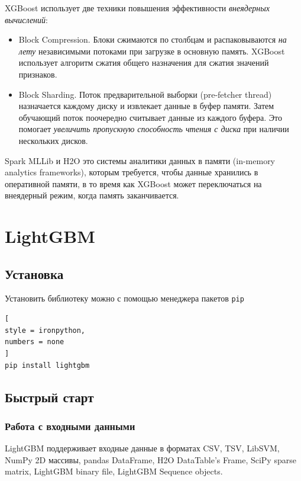 \documentclass[%
	11pt,
	a4paper,
	utf8,
		]{article}
\begin{document}
XGBoost использует две техники повышения эффективности \emph{внеядерных вычислений}:
\begin{itemize}
	\item Block Compression. Блоки сжимаются по столбцам и распаковываются \emph{на лету} независимыми потоками при загрузке в основную память. XGBoost использует алгоритм сжатия общего назначения для сжатия значений признаков. 
	
	\item Block Sharding. Поток предварительной выборки (pre-fetcher thread) назначается каждому диску и извлекает данные в буфер памяти. Затем обучающий поток поочередно считывает данные из каждого буфера. Это помогает \emph{увеличить пропускную способность чтения с диска} при наличии нескольких дисков.
\end{itemize}

Spark MLLib и H2O это системы аналитики данных в памяти (in-memory analytics frameworks), которым требуется, чтобы данные хранились в оперативной памяти, в то время как XGBoost может переключаться на внеядерный режим, когда память заканчивается.











\section{LightGBM}

\subsection{Установка}

Установить библиотеку можно с помощью менеджера пакетов \verb|pip|
\begin{lstlisting}[
style = ironpython,
numbers = none
]
pip install lightgbm
\end{lstlisting}

\subsection{Быстрый старт}

\subsubsection{Работа с входными данными}

LightGBM поддерживает входные данные в форматах CSV, TSV, LibSVM, NumPy 2D массивы, pandas DataFrame, H2O DataTable's Frame, SciPy sparse matrix, LightGBM binary file, LightGBM Sequence objects.
\end{document}
